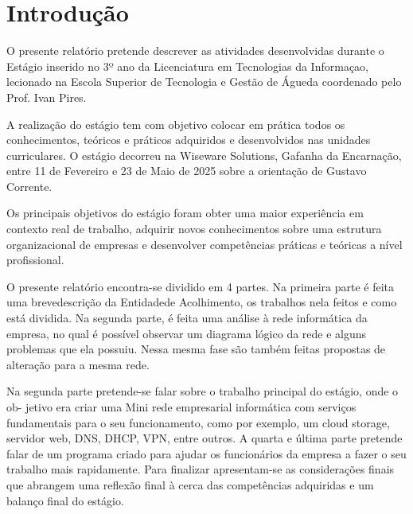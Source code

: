 \chapter{Introdução}%
\label{chapter:introduction}

O presente relatório pretende descrever as atividades desenvolvidas durante o Estágio
inserido no 3º ano da Licenciatura em Tecnologias da Informaçao, lecionado na 
Escola Superior de Tecnologia e Gestão de Águeda coordenado
pelo Prof. Ivan Pires.

A realização do estágio tem com objetivo colocar em prática todos os conhecimentos,
teóricos e práticos adquiridos e desenvolvidos nas unidades curriculares.
O estágio decorreu na Wiseware Solutions, Gafanha da Encarnação, entre 11
de Fevereiro e 23 de Maio de 2025 sobre a orientação de
Gustavo Corrente.

Os principais objetivos do estágio foram obter uma maior experiência em contexto
real de trabalho, adquirir novos conhecimentos sobre uma estrutura organizacional de
empresas e desenvolver competências práticas e teóricas a nível profissional.

O presente relatório encontra-se dividido em 4 partes. Na primeira parte é feita uma
brevedescrição da Entidadede Acolhimento, os trabalhos nela feitos e como está dividida.
Na segunda parte, é feita uma análise à rede informática da empresa, no qual é possível
observar um diagrama lógico da rede e alguns problemas que ela possuiu. Nessa mesma
fase são também feitas propostas de alteração para a mesma rede.

Na segunda parte pretende-se falar sobre o trabalho principal do estágio, onde o ob-
jetivo era criar uma Mini rede empresarial informática com serviços fundamentais para
o seu funcionamento, como por exemplo, um cloud storage, servidor web, DNS, DHCP,
VPN, entre outros. 
A quarta e última parte pretende falar de um programa criado para
ajudar os funcionários da empresa a fazer o seu trabalho mais rapidamente.
Para finalizar apresentam-se as considerações finais que abrangem uma reflexão final à
cerca das competências adquiridas e um balanço final do estágio.

\begin{introduction}
\end{introduction}